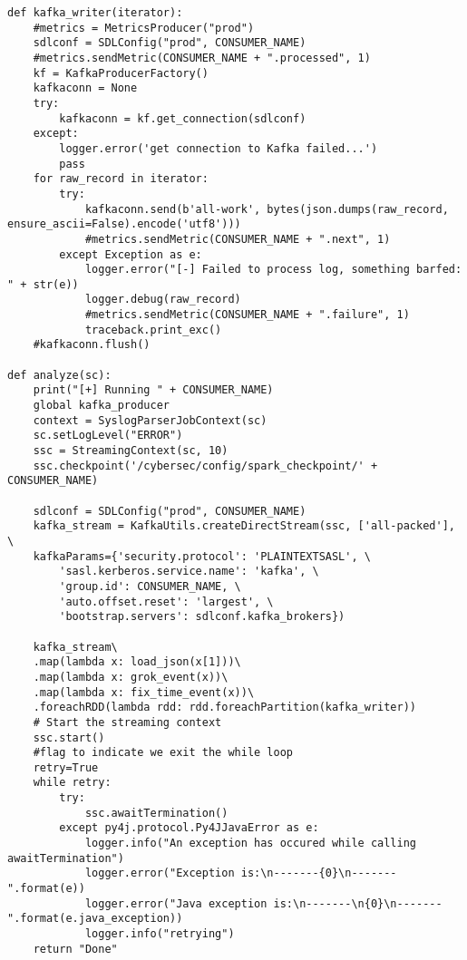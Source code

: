 \documentclass[a4paper,12pt]{article}
\begin{document}
{\begin{lstlisting}
def kafka_writer(iterator):
    #metrics = MetricsProducer("prod")
    sdlconf = SDLConfig("prod", CONSUMER_NAME)
    #metrics.sendMetric(CONSUMER_NAME + ".processed", 1)
    kf = KafkaProducerFactory()
    kafkaconn = None
    try:
        kafkaconn = kf.get_connection(sdlconf)
    except:
        logger.error('get connection to Kafka failed...')
        pass
    for raw_record in iterator:
        try:
            kafkaconn.send(b'all-work', bytes(json.dumps(raw_record, ensure_ascii=False).encode('utf8')))
            #metrics.sendMetric(CONSUMER_NAME + ".next", 1)
        except Exception as e:
            logger.error("[-] Failed to process log, something barfed: " + str(e))
            logger.debug(raw_record)
            #metrics.sendMetric(CONSUMER_NAME + ".failure", 1)
            traceback.print_exc()
    #kafkaconn.flush()

def analyze(sc):
    print("[+] Running " + CONSUMER_NAME)
    global kafka_producer
    context = SyslogParserJobContext(sc)
    sc.setLogLevel("ERROR")
    ssc = StreamingContext(sc, 10)
    ssc.checkpoint('/cybersec/config/spark_checkpoint/' + CONSUMER_NAME)

    sdlconf = SDLConfig("prod", CONSUMER_NAME)
    kafka_stream = KafkaUtils.createDirectStream(ssc, ['all-packed'], \
    kafkaParams={'security.protocol': 'PLAINTEXTSASL', \
        'sasl.kerberos.service.name': 'kafka', \
        'group.id': CONSUMER_NAME, \
        'auto.offset.reset': 'largest', \
        'bootstrap.servers': sdlconf.kafka_brokers})

    kafka_stream\
    .map(lambda x: load_json(x[1]))\
    .map(lambda x: grok_event(x))\
    .map(lambda x: fix_time_event(x))\
    .foreachRDD(lambda rdd: rdd.foreachPartition(kafka_writer))
    # Start the streaming context
    ssc.start()
    #flag to indicate we exit the while loop
    retry=True
    while retry:
    	try:
    		ssc.awaitTermination()
    	except py4j.protocol.Py4JJavaError as e:
    		logger.info("An exception has occured while calling awaitTermination")
    		logger.error("Exception is:\n-------{0}\n-------".format(e))
    		logger.error("Java exception is:\n-------\n{0}\n-------".format(e.java_exception))
    		logger.info("retrying")
    return "Done"
\end{lstlisting}

}
\end{document}
